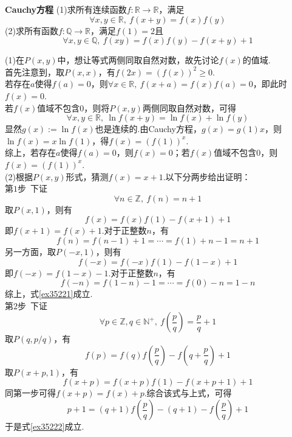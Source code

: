 \documentclass[lang=cn, zihao=5]{elegantbook}
\newcommand{\ssb}[1]{\left( #1 \right)}
\newcommand{\R}{\mathbb{R}}
\newcommand{\examplefont}[1]{\color{mgreen} \textbf{#1}}
\begin{document}
\begin{example}{\examplefont{Cauchy方程}}
	(1)求所有连续函数$f:\R \to \R$，满足$$\forall x,y\in \R,~f(x+y)=f(x)f(y)$$
	(2)求所有函数$f:\mathbb{Q} \to \R$，满足$f(1)=2$且$$\forall x,y \in \mathbb{Q},~f(xy)=f(x)f(y)-f(x+y)+1$$
\end{example}
\begin{solution}
	(1)在$P(x,y)$中，想让等式两侧同取自然对数，故先讨论$f(x)$的值域. \\
	首先注意到，取$P(x,x)$，有$f(2x)=(f(x))^2 \geq 0$. \\
	若存在$a$使得$f(a)=0$，则$\forall x \in \R,~f(x+a)=f(x)f(a)=0$，即此时$f(x)=0$. \\
	若$f(x)$值域不包含$0$，则将$P(x,y)$两侧同取自然对数，可得$$\forall x,y \in \R,~ \ln f(x+y) = \ln f(x) + \ln f(y)$$
	显然$g(x):= \ln f(x)$也是连续的.由Cauchy方程，$g(x)=g(1)x$，则$\ln f(x) = x \ln f(1)$，得$f(x)=(f(1))^x$. \\
	综上，若存在$a$使得$f(a)=0$，则$f(x)=0$；若$f(x)$值域不包含$0$，则$f(x)=(f(1))^x$. \\
	(2)根据$P(x,y)$形式，猜测$f(x)=x+1$.以下分两步给出证明： \\
	第$1$步~下证
	\begin{equation}
		\forall n \in \mathbb{Z},~ f(n)=n+1 \label{ex35221}
	\end{equation}
	取$P(x,1)$，则有$$f(x)=f(x)f(1)-f(x+1)+1$$
	即$f(x+1)=f(x)+1$.对于正整数$n$，有$$f(n)=f(n-1)+1=\cdots = f(1)+n-1=n+1$$
	另一方面，取$P(-x,1)$，则有$$f(-x)=f(-x)f(1)-f(1-x)+1$$
	即$f(-x)=f(1-x)-1$.对于正整数$n$，有$$f(-n)=f(1-n)-1=\cdots = f(0)-n=1-n$$
	综上，式\ref{ex35221}成立. \\
	第$2$步~下证
	\begin{equation}
		\forall p \in \mathbb{Z},q \in \mathbb{N}^+,~f\ssb{\frac{p}{q}} = \frac{p}{q} +1 \label{ex35222}
	\end{equation}
	取$P(q,p/q)$，有$$f(p) =f(q)f\ssb{\frac{p}{q}} - f\ssb{q+\frac{p}{q}}+1$$
	取$P(x+p,1)$，有$$f(x+p)=f(x+p)f(1)-f(x+p+1)+1$$
	同第一步可得$f(x+p)=f(x)+p$.综合该式与上式，可得$$p+1 = (q+1)f\ssb{\frac{p}{q}} - (q+1) - f\ssb{\frac{p}{q}} +1$$
	于是式\ref{ex35222}成立.
\end{solution}
\end{document}
